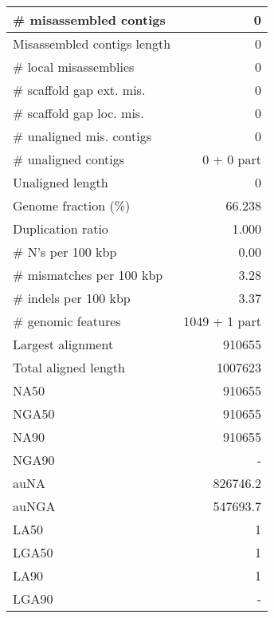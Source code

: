 \documentclass[12pt,a4paper]{article}
\begin{document}
\begin{table}[ht]
\begin{center}
\begin{tabular}{|l*{1}{|r}|}
\# misassembled contigs & 0 \\ \hline
Misassembled contigs length & 0 \\ \hline
\# local misassemblies & 0 \\ \hline
\# scaffold gap ext. mis. & 0 \\ \hline
\# scaffold gap loc. mis. & 0 \\ \hline
\# unaligned mis. contigs & 0 \\ \hline
\# unaligned contigs & 0 + 0 part \\ \hline
Unaligned length & 0 \\ \hline
Genome fraction (\%) & 66.238 \\ \hline
Duplication ratio & 1.000 \\ \hline
\# N's per 100 kbp & 0.00 \\ \hline
\# mismatches per 100 kbp & 3.28 \\ \hline
\# indels per 100 kbp & 3.37 \\ \hline
\# genomic features & 1049 + 1 part \\ \hline
Largest alignment & 910655 \\ \hline
Total aligned length & 1007623 \\ \hline
NA50 & 910655 \\ \hline
NGA50 & 910655 \\ \hline
NA90 & 910655 \\ \hline
NGA90 & - \\ \hline
auNA & 826746.2 \\ \hline
auNGA & 547693.7 \\ \hline
LA50 & 1 \\ \hline
LGA50 & 1 \\ \hline
LA90 & 1 \\ \hline
LGA90 & - \\ \hline
\end{tabular}
\end{center}
\end{table}
\end{document}

